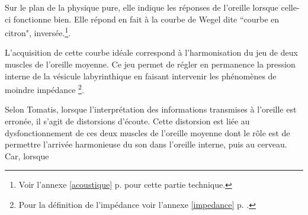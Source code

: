 Sur le plan de la physique pure, elle indique les réponses de l'oreille
lorsque celle-ci fonctionne bien. Elle répond en fait à la courbe
de Wegel dite ``courbe en citron", inversée.\footnote{%
		Voir l'annexe \ref{acoustique} p. \pageref{acoustique}
		 pour cette partie technique.}.

L'acquisition de cette courbe idéale correspond à l'harmonisation
du jeu de deux muscles de l'oreille moyenne. Ce jeu
permet de régler en permanence la pression interne de la vésicule
labyrinthique en faisant intervenir les phénomènes de moindre impédance%
\footnote{Pour la définition de l'impédance voir l'annexe \ref{impedance} 
	p. \pageref{impedance}.}.
 



Selon Tomatis, lorsque l'interprétation des informations transmises à l'oreille est erronée, il s'agit de distorsions d'écoute. Cette distorsion est liée au dysfonctionnement
de ces deux muscles de l'oreille moyenne dont le rôle est de permettre l'arrivée
harmonieuse du son dans l'oreille interne, puis au cerveau. Car, lorsque
